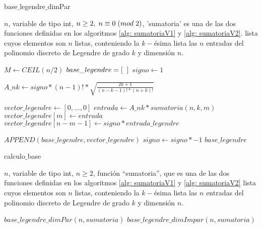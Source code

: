 \begin{algorithm}
\caption{base$\_$legendre$\_$dimPar}\label{alg: legendre par}
\begin{algorithmic} [1]
\REQUIRE $n$, variable de tipo int, $n \geq 2, \hspace{0.1cm} n \equiv 0 \hspace{0.1cm} (mod \hspace{0.1cm} 2)$, 'sumatoria' es una de las dos funciones definidas en los algoritmos
\ref{alg: sumatoriaV1} y \ref{alg: sumatoriaV2}.
\ENSURE lista cuyos elementos son $n$ listas, conteniendo
la $k-$ésima lista las $n$ entradas del polinomio discreto de Legendre de
grado $k$ y dimensión $n$.


\STATE $M \leftarrow CEIL(n/2)$
\STATE $base\_legendre=[ \hspace{0.2cm} ]$ 
\STATE $signo \leftarrow 1$ 

\STATE $A\_nk \leftarrow signo * (n-1)!*
\sqrt{\frac{
2k+1
}{
(n-k-1)!*(n+k)!
}}$

\STATE $vector\_legendre \leftarrow [ 0, \ldots , 0]$  
\STATE $entrada \leftarrow A\_nk * sumatoria(n,k,m)$
\STATE $vector\_legendre[m] \leftarrow entrada$ 
\STATE $vector\_legendre[n-m-1] \leftarrow signo *entrada\_legendre$
\ENDFOR

\STATE $APPEND(base\_legendre, vector\_legendre)$
\STATE $signo \leftarrow signo * -1$
\ENDFOR
\RETURN $base\_legendre$
\end{algorithmic}
\end{algorithm}



\begin{algorithm}
\caption{calculo$\_$base}\label{alg: legendre}
\begin{algorithmic} [1]
\REQUIRE $n$, variable de tipo int, $n \geq 2$, función ``sumatoria'', que
es una de las dos funciones definidas en los algoritmos
\ref{alg: sumatoriaV1} y \ref{alg: sumatoriaV2}
\ENSURE lista cuyos elementos son $n$ listas, conteniendo
la $k-$ésima lista las $n$ entradas del polinomio discreto de Legendre de
grado $k$ y dimensión $n$.

\RETURN $base\_legendre\_dimPar(n, sumatoria)$
\ELSE
\RETURN $base\_legendre\_dimImpar(n, sumatoria)$
\ENDIF
\end{algorithmic}
\end{algorithm}


